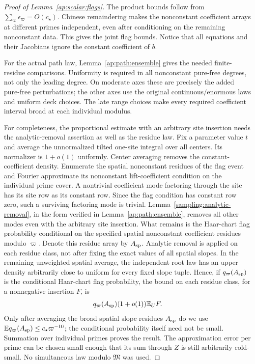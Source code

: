 \begin{proof}[Proof of Lemma~\ref{ap:scalar:flags}]
The product bounds follow from
$\sum_\varpi\epsilon_\varpi=O(c_\star)$. Chinese remaindering makes
the nonconstant coefficient arrays at different primes independent,
even after conditioning on the remaining nonconstant data. This gives
the joint flag bounds. Notice that all equations and their Jacobians
ignore the constant coefficient of $b$.

For the actual path law, Lemma~\ref{ap:path:ensemble} gives the needed
finite-residue comparisons. Uniformity is required in all nonconstant
pure-free degrees, not only the leading degree. On moderate axes these
are precisely the added pure-free perturbations; the other axes use
the original continuous/enormous laws and uniform deck choices. The
late range choices make every required coefficient interval broad at
each individual modulus.

For completeness, the proportional estimate with an arbitrary site
insertion needs the analytic-removal assertion as well as the residue
law. Fix a parameter value $t$ and average the unnormalized tilted
one-site integral over all centers. Its normalizer is $1+o(1)$
uniformly. Center averaging removes the constant-coefficient density.
Enumerate the spatial nonconstant residues of the flag event and
Fourier approximate its nonconstant lift-coefficient condition on the
individual prime cover. A nontrivial coefficient mode factoring
through the site has its site row as its constant row. Since the
flag condition has constant row zero, such a surviving factoring mode
is trivial. Lemma~\ref{sampling:analytic-removal}, in the form verified
in Lemma~\ref{ap:path:ensemble}, removes all other modes even with the
arbitrary site insertion. What remains is the Haar-chart flag
probability conditional on the specified spatial nonconstant
coefficient residues modulo $\varpi$. Denote this residue array by
$A_{\rm sp}$. Analytic removal is applied on each residue class, not
after fixing the exact values of all spatial slopes. In the remaining
unweighted spatial average, the independent root law has an upper
density arbitrarily close to uniform for every fixed slope tuple.
Hence, if $q_\varpi(A_{\rm sp})$ is the conditional Haar-chart flag
probability, the bound on each residue class, for a nonnegative
insertion $F$, is
\[
 q_\varpi(A_{\rm sp})(1+o(1))\mathbb E_U F.
\]
Only after averaging the broad spatial slope residues $A_{\rm sp}$ do we use
$\mathbb E q_\varpi(A_{\rm sp})\le c_\star\varpi^{-10}$; the conditional
probability itself need not be small. Summation over individual
primes proves the result.
The approximation error per prime can be chosen small enough that its
sum through $Z$ is still arbitrarily cold-small. No simultaneous law
modulo $\mathfrak M$ was used.
\end{proof}

